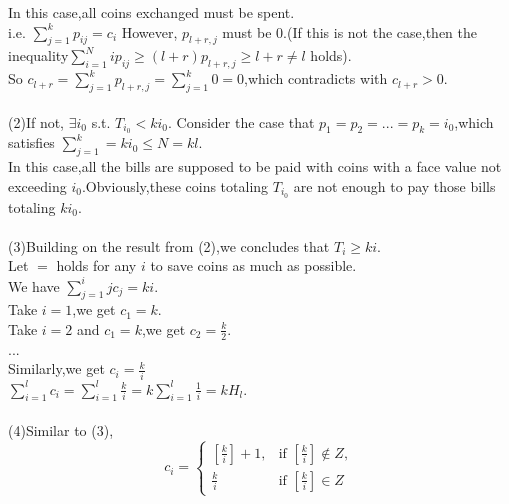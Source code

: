 \documentclass{article}
\begin{document}
In this case,all coins exchanged must be spent.\\
i.e. $\sum_{j=1}^kp_{ij}=c_i$
However, $p_{l+r,j}$ must be $0$.(If this is not the case,then the inequality$\sum_{i=1}^{N}ip_{ij}\geq (l+r)p_{l+r,j}\geq l+r\neq l$ holds).\\
So $c_{l+r}=\sum_{j=1}^k {p_{l+r,j}}=\sum_{j=1}^k 0 = 0$,which contradicts with $c_{l+r}>0$.\\
\\
(2)If not, $\exists i_0$ s.t. $T_{i_0}<ki_0$.
Consider the case that $p_1=p_2=...=p_k=i_0$,which satisfies $\sum_{j=1}^k=ki_0\leq N=kl$.\\
In this case,all the bills are supposed to be paid with coins with a face value not exceeding $i_0$.Obviously,these coins totaling $T_{i_0}$ are not enough to pay those bills totaling $ki_0$.\\
\\
(3)Building on the result from (2),we concludes that $T_i\geq ki$.\\
Let $=$ holds for any $i$ to save coins as much as possible.\\
We have $\sum_{j=1}^i jc_j=ki$.\\
Take $i=1$,we get $c_1=k$.\\
Take $i=2$ and $c_1=k$,we get $c_2 = \frac{k}{2}$.\\
...\\
Similarly,we get $c_i=\frac{k}{i}$\\
$\sum_{i=1}^lc_i=\sum_{i=1}^l \frac{k}{i}=k\sum_{i=1}^l\frac{1}{i}=kH_l$.\\
\\
(4)Similar to (3),\\
\[ c_i= \begin{cases} [\frac{k}{i}]+1, & \text{if } [\frac{k}{i}] \notin Z ,\\\frac{k}{i}  & \text{if }[\frac{k}{i}] \in Z \end{cases} \]
\end{document}
